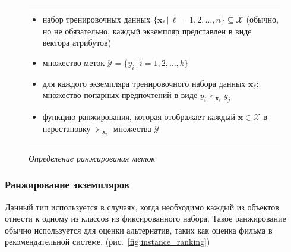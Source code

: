 		\begin{figure}[h]
			\hrule
			\begin{description}[nosep]
				\item[Дано:] \null\leavevmode
				\begin{itemize}[itemsep=0pt,leftmargin=2ex,label=\textbf{---}]
					\item набор тренировочных данных $\{\bm{x}_\ell \, | \, \ell = 1,2,\dotsc,n\} \subseteq \mathcal{X} $ (обычно, но не обязательно, каждый экземпляр представлен в виде вектора атрибутов)
					\item множество меток $\mathcal{Y} = \{y_i\,|\,i = 1,2,\dotsc,k\}$
					\item для каждого экземпляра тренировочного набора данных $\bm{x}_\ell$: множество попарных предпочтений в виде $y_i \succ_{\bm{x}_\ell} y_j $
				\end{itemize}
				\item[Найти:] \null\leavevmode
				\begin{itemize}[itemsep=0pt,leftmargin=2ex,label=\textbf{---}]
					\item функцию ранжирования, которая отображает каждый $\bm{x} \in \mathcal{X}$ в перестановку $\succ_{\bm{x}_\ell}$ множества $\mathcal{Y}$
				\end{itemize}
			\end{description} 
			\hrule
			\caption{\it Определение ранжирования меток \cite[Рис.~1]{plbook:Introduction:2010}}
			\label{fig:label_ranking}
		\end{figure}
	
	\subsubsection{Ранжирование экземпляров}
		Данный тип используется в случаях, когда необходимо каждый из объектов отнести к одному из классов из фиксированного набора. Такое ранжирование обычно используется для оценки альтернатив, таких как оценка фильма в рекомендательной системе. (рис.~\ref{fig:instance_ranking})
		
